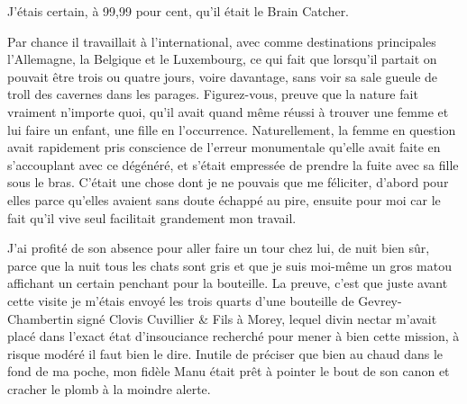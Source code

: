 J’étais certain, à 99,99 pour cent, qu’il était le Brain Catcher.

Par chance il travaillait à l’international, avec comme destinations principales l’Allemagne, la Belgique et le Luxembourg, ce qui fait que lorsqu’il partait on pouvait être trois ou quatre jours, voire davantage, sans voir sa sale gueule de troll des cavernes dans les parages. Figurez-vous, preuve que la nature fait vraiment n’importe quoi, qu’il avait quand même réussi à trouver une femme et lui faire un enfant, une fille en l’occurrence. Naturellement, la femme en question avait rapidement pris conscience de l’erreur monumentale qu’elle avait faite en s’accouplant avec ce dégénéré, et s’était empressée de prendre la fuite avec sa fille sous le bras. C’était une chose dont je ne pouvais que me féliciter, d’abord pour elles parce qu’elles avaient sans doute échappé au pire, ensuite pour moi car le fait qu’il vive seul facilitait grandement mon travail.

J’ai profité de son absence pour aller faire un tour chez lui, de nuit bien sûr, parce que la nuit tous les chats sont gris et que je suis moi-même un gros matou affichant un certain penchant pour la bouteille. La preuve, c’est que juste avant cette visite je m’étais envoyé les trois quarts d’une bouteille de Gevrey-Chambertin signé Clovis Cuvillier \& Fils à Morey, lequel divin nectar m’avait placé dans l’exact état d’insouciance recherché pour mener à bien cette mission, à risque modéré il faut bien le dire. Inutile de préciser que bien au chaud dans le fond de ma poche, mon fidèle Manu était prêt à pointer le bout de son canon et cracher le plomb à la moindre alerte.

